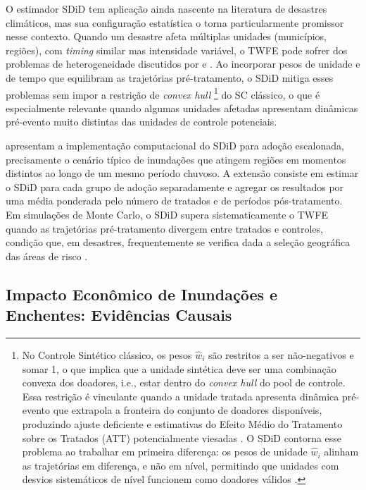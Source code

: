 \documentclass[a4paper,12pt]{article}
\begin{document}
O estimador SDiD \cite{arkhangelsky2021} tem aplicação ainda nascente na literatura de
desastres climáticos, mas sua configuração estatística o torna particularmente promissor
nesse contexto. Quando um desastre afeta múltiplas unidades (municípios, regiões), com
\textit{timing} similar mas intensidade variável, o TWFE pode sofrer dos problemas de
heterogeneidade discutidos por  e
. Ao incorporar pesos de unidade e de tempo que
equilibram as trajetórias pré-tratamento, o SDiD mitiga esses problemas sem impor a
restrição de \textit{convex hull}%
\footnote{No Controle Sintético clássico, os pesos $\hat{w}_i$ são restritos a ser
não-negativos e somar 1, o que implica que a unidade sintética deve ser uma
combinação convexa dos doadores, i.e., estar dentro do \textit{convex hull} do
pool de controle. Essa restrição é vinculante quando a unidade tratada apresenta
dinâmica pré-evento que extrapola a fronteira do conjunto de doadores disponíveis,
produzindo ajuste deficiente e estimativas do Efeito Médio do Tratamento sobre os
Tratados (ATT) potencialmente viesadas \cite{abadie2021}. O SDiD contorna esse
problema ao trabalhar em primeira diferença:
os pesos de unidade $\hat{w}_i$ alinham as trajetórias em diferença, e não em nível,
permitindo que unidades com desvios sistemáticos de nível funcionem como doadores
válidos \cite{arkhangelsky2021}.}
do SC clássico, o que é especialmente relevante quando
algumas unidades afetadas apresentam dinâmicas pré-evento muito distintas das unidades
de controle potenciais.

 apresentam a implementação computacional do SDiD para
adoção escalonada, precisamente o cenário típico de inundações que atingem regiões em
momentos distintos ao longo de um mesmo período chuvoso. A extensão consiste em
estimar o SDiD para cada grupo de adoção separadamente e agregar os resultados por
uma média ponderada pelo número de tratados e de períodos pós-tratamento. Em
simulações de Monte Carlo, o SDiD supera sistematicamente o TWFE quando as
trajetórias pré-tratamento divergem entre tratados e controles, condição que, em
desastres, frequentemente se verifica dada a seleção geográfica das áreas de risco
\cite{arkhangelsky2021}.

\subsection{Impacto Econômico de Inundações e Enchentes: Evidências Causais}
\label{sub:impacto}
\end{document}
